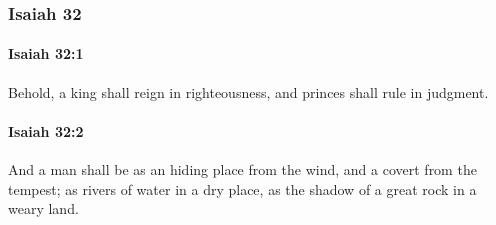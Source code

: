 	\subsubsection{Isaiah 32} %
		\label{ISAIAH-32}

		\paragraph{Isaiah 32:1} %
			\label{ISAIAH-32-1}

			Behold, a king shall reign in righteousness, and princes shall rule in judgment.


		\paragraph{Isaiah 32:2} %
			\label{ISAIAH-32-2}

			And a man shall be as an hiding place from the wind, and a covert from the tempest; as rivers of water in a dry place, as the shadow of a great rock in a weary land.

